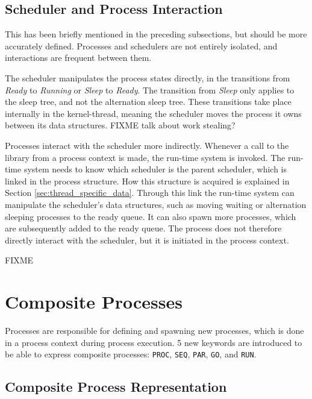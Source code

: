 \subsection{Scheduler and Process Interaction}
\label{subsec:scheduler_process_interaction}

This has been briefly mentioned in the preceding subsections, but should be more accurately defined. Processes and schedulers are not entirely isolated, and interactions are frequent between them.

The scheduler manipulates the process states directly, in the transitions from \textit{Ready} to \textit{Running} or \textit{Sleep} to \textit{Ready}. The transition from \textit{Sleep} only applies to the sleep tree, and not the alternation sleep tree. These transitions take place internally in the kernel\hyp{}thread, meaning the scheduler moves the process it owns between its data structures. FIXME talk about work stealing?

Processes interact with the scheduler more indirectly. Whenever a call to the library from a process context is made, the run\hyp{}time system is invoked. The run\hyp{}time system needs to know which scheduler is the parent scheduler, which is linked in the process structure. How this structure is acquired is explained in Section \ref{sec:thread_specific_data}. Through this link the run\hyp{}time system can manipulate the scheduler's data structures, such as moving waiting or alternation sleeping processes to the ready queue. It can also spawn more processes, which are subsequently added to the ready queue. The process does not therefore directly interact with the scheduler, but it is initiated in the process context. 

FIXME


\section{Composite Processes}
\label{sec:composite_processes}

Processes are responsible for defining and spawning new processes, which is done in a process context during process execution. 5 new keywords are introduced to be able to express composite processes: \texttt{PROC}, \texttt{SEQ}, \texttt{PAR}, \texttt{GO}, and \texttt{RUN}. 

\subsection{Composite Process Representation}

